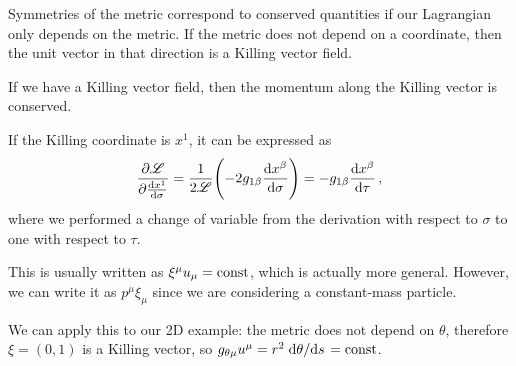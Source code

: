 \documentclass[main.tex]{subfiles}
\begin{document}
Symmetries of the metric correspond to conserved quantities if our Lagrangian only depends on the metric.
If the metric does not depend on a coordinate, then the unit vector in that direction is a Killing vector field. 

If we have a Killing vector field, then the momentum along the Killing vector is conserved.

If the Killing coordinate is \(x^{1}\), it can be expressed as 
%
\begin{align}
  \pdv{\mathscr L}{\dv{x^{1}}{\sigma }} = \frac{1}{2 \mathscr L} \qty(-2 g_{1 \beta } \dv{x^{\beta }}{\sigma }) = - g_{1 \beta } \dv{x^{\beta }}{\tau }
\,,
\end{align}
%
where we performed a change of variable from the derivation with respect to \(\sigma \) to one with respect to \(\tau \).

This is usually written as \(\xi^{\mu } u_{\mu } = \text{const}\), which is actually more general.
However, we can write it as \(p^{\mu } \xi_{\mu }\) since we are considering a constant-mass particle.

We can apply this to our 2D example: the metric does not depend on \(\theta \), therefore \(\xi = (0,1)\) is a Killing vector, so \(g_{\theta \mu  } u^{\mu } = r^2 \dv*{\theta }{s} = \text{const}\).
\end{document}
